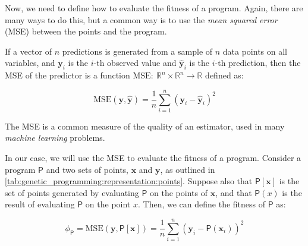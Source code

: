   
  Now, we need to define how to evaluate the fitness of a program.
  Again, there are many ways to do this, but a common way is to use the
  \emph{mean squared error} (MSE) between the points and the program.

  \begin{definition}
  \label{def:mse}
    If a vector of \(n\) predictions is generated from a sample of \(n\) data
    points on all variables, and \(\mathbf{y}_i\) is the \(i\)-th observed value
    and \(\hat{\mathbf{y}}_i\) is the \(i\)-th prediction, then the MSE of the 
    predictor is a function \(\mathrm{MSE}:\: \mathbb{R}^n \times \mathbb{R}^n
    \to \mathbb{R}\) defined as:

    \begin{equation}
      \label{eq:mse}
      \mathrm{MSE}(\mathbf{y}, \hat{\mathbf{y}}) 
        = \frac{1}{n} \sum_{i=1}^{n} (\mathbf{y}_i - \hat{\mathbf{y}}_i)^2
    \end{equation}
  \end{definition}

  The MSE is a common measure of the quality of an estimator, used in many
  \textit{machine learning} problems.

  In our case, we will use the MSE to evaluate the fitness of a program.
  Consider a program \(\mathsf{P}\) and two sets of points, \(\mathbf{x}\) and 
  \(\mathbf{y}\), as outlined in 
  \vref{tab:genetic_programming:representation:points}.
  Suppose also that \(\mathsf{P}[\mathbf{x}]\) is the set of points generated
  by evaluating \(\mathsf{P}\) on the points of \(\mathbf{x}\), and that
  \(\mathsf{P}(x)\) is the result of evaluating \(\mathsf{P}\) on the point
  \(x\).
  Then, we can define the fitness of \(\mathsf{P}\) as:

  \begin{equation}
  \label{eq:genetic_programming:representation:fitness}
    \phi_\mathsf{P} = \mathrm{MSE}(\mathbf{y}, \mathsf{P}[\mathbf{x}])
      = \frac{1}{n} \sum_{i=1}^{n} (\mathbf{y}_i - \mathsf{P}(\mathbf{x}_i))^2
  \end{equation}

